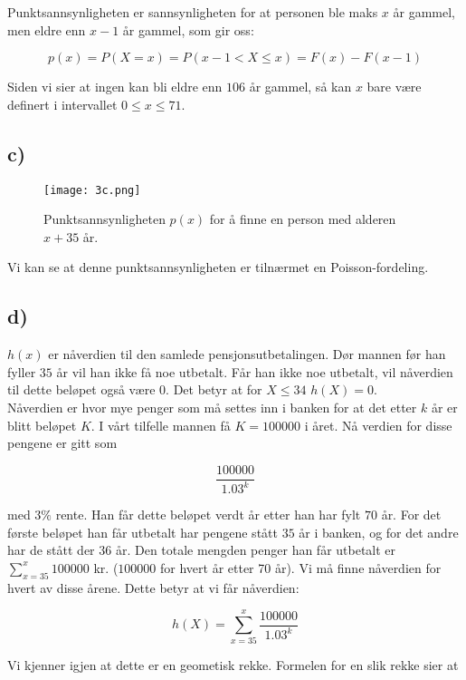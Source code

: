 \documentclass[a4paper,norsk, 10pt]{article}
\begin{document}
Punktsannsynligheten er sannsynligheten for at personen ble maks $x$ år gammel, men eldre enn $x-1$ år gammel, som gir oss:

$$
p(x) = P(X=x) = P(x-1<X\leq x) = F(x) - F(x-1)
$$

Siden vi sier at ingen kan bli eldre enn $106$ år gammel, så kan $x$ bare være definert i intervallet $0\leq x \leq 71$.

\subsection*{c)}

\begin{figure}[H]
\centering
\texttt{[image: 3c.png]}
\caption{Punktsannsynligheten $p(x)$ for å finne en person med alderen $x + 35$ år.}
\end{figure}

Vi kan se at denne punktsannsynligheten er tilnærmet en Poisson-fordeling.

\subsection*{d)}

$h(x)$ er nåverdien til den samlede pensjonsutbetalingen. Dør mannen før han fyller $35$ år vil han ikke få noe utbetalt. Får han ikke noe utbetalt, vil nåverdien til dette beløpet også være 0. Det betyr at for $X\leq 34$ $h(X) = 0$.\\

Nåverdien er hvor mye penger som må settes inn i banken for at det etter $k$ år er blitt beløpet $K$. I vårt tilfelle mannen få $K = 100 000$ i året. Nå verdien for disse pengene er gitt som

$$
\frac{100000}{1.03^k}
$$  

med $3\%$ rente. Han får dette beløpet verdt år etter han har fylt $70$ år. For det første beløpet han får utbetalt har pengene stått $35$ år i banken, og for det andre har de stått der $36$ år. Den totale mengden penger han får utbetalt er $\sum_{x = 35}^{x}100000$ kr. ($100000$ for hvert år etter 70 år). Vi må finne nåverdien for hvert av disse årene. Dette betyr at vi får nåverdien:

\begin{equation}
h(X) = \sum_{x = 35}^{x}\frac{100000}{1.03^k}
\label{eq:h}
\end{equation}

Vi kjenner igjen at dette er en geometisk rekke. Formelen for en slik rekke sier at
\end{document}
